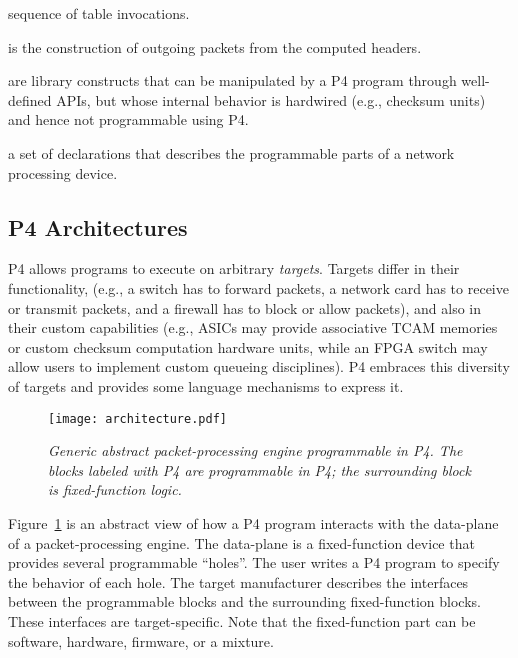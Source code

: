 \begin{figure*}[h]
\begin{mdframed}[style=mdstyle]
\begin{description}
  sequence of table invocations.
\item[Deparsing] is the construction of outgoing packets from the
  computed headers.
\item[Extern objects] are library constructs that can be manipulated
  by a P4 program through well-defined APIs, but whose internal
  behavior is hardwired (e.g., checksum units) and hence not
  programmable using P4.
\item[Architecture definition:] a set of declarations that describes
  the programmable parts of a network processing device.
    \end{description}
  \end{mdframed}
  \caption{\sl Core abstractions of the P4 programming language.\label{fig:abstractions}}
\end{figure*}

\subsection{P4 Architectures}

P4 allows programs to execute on arbitrary \emph{targets}.  Targets
differ in their functionality, (e.g., a switch has to forward packets,
a network card has to receive or transmit packets, and a firewall has
to block or allow packets), and also in their custom capabilities
(e.g., ASICs may provide associative TCAM memories or custom checksum
computation hardware units, while an FPGA switch may allow users to
implement custom queueing disciplines).  P4 embraces this diversity of
targets and provides some language mechanisms to express it.

\begin{figure}[h]
  \centerline{\texttt{[image: architecture.pdf]}}
  \caption{\sl Generic abstract packet-processing engine programmable
    in P4.  The blocks labeled with P4 are programmable in P4; the
    surrounding block is fixed-function
    logic.\label{fig:architecture}}
\end{figure}

Figure~\ref{fig:architecture} is an abstract view of how a P4 program
interacts with the data-plane of a packet-processing engine.  The
data-plane is a fixed-function device that provides several
programmable ``holes''.  The user writes a P4 program to specify the
behavior of each hole.  The target manufacturer describes the
interfaces between the programmable blocks and the surrounding
fixed-function blocks.  These interfaces are target-specific.  Note
that the fixed-function part can be software, hardware, firmware, or a
mixture.

